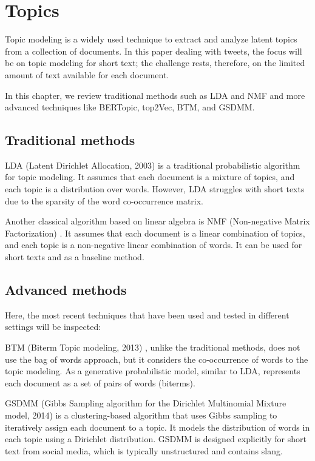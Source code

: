 \section[Topics]{Topics}
Topic modeling is a widely used technique to extract and analyze latent topics from a collection of documents. In this paper dealing with tweets, the focus will be on topic modeling for short text; the challenge rests, therefore, on the limited amount of text available for each document. 

In this chapter, we review traditional methods such as LDA and NMF and more advanced techniques like BERTopic, top2Vec, BTM, and GSDMM. 

\subsection{Traditional methods}
LDA (Latent Dirichlet Allocation, 2003)\cite{blei_latent_2003} is a traditional probabilistic algorithm for topic modeling. It assumes that each document is a mixture of topics, and each topic is a distribution over words. However, LDA struggles with short texts due to the sparsity of the word co-occurrence matrix.

Another classical algorithm based on linear algebra is NMF (Non-negative Matrix Factorization) \cite{lee_algorithms_2000}\cite{kuang_nonnegative_2015}. It assumes that each document is a linear combination of topics, and each topic is a non-negative linear combination of words. It can be used for short texts and as a baseline method.

\subsection{Advanced methods}
Here, the most recent techniques that have been used and tested in different settings will be inspected:

BTM (Biterm Topic modeling, 2013) \cite{yan_biterm_2013}, unlike the traditional methods, does not use the bag of words approach, but it considers the co-occurrence of words to the topic modeling. As a generative probabilistic model, similar to LDA, represents each document as a set of pairs of words (biterms).

GSDMM (Gibbs Sampling algorithm for the Dirichlet Multinomial Mixture model, 2014) \cite{yin_dirichlet_2014} is a clustering-based algorithm that uses Gibbs sampling to iteratively assign each document to a topic. It models the distribution of words in each topic using a Dirichlet distribution. GSDMM is designed explicitly for short text from social media, which is typically unstructured and contains slang.


